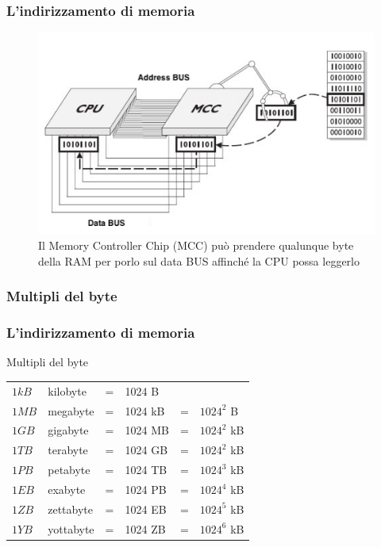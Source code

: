 \begin{frame}
	\frametitle{L'indirizzamento di memoria}
	
	\begin{figure}[!htbp]
		\centering 
		\includegraphics[width=0.85\linewidth]{images/5_memory/mcc.png}
		\caption{Il Memory Controller Chip (MCC) può prendere qualunque byte della RAM per porlo sul data BUS affinché la CPU possa leggerlo}
	\end{figure}
\end{frame}






\subsubsection[Multipli del byte]{Multipli del byte}
\begin{frame}
	\frametitle{L'indirizzamento di memoria}
	
	\begin{block}{Multipli del byte}
		\begin{table}[]
			\centering
			\begin{tabular}{llclcl}
			$1kB$ & kilobyte & = & 1024 B & &  \\
			$1MB$ & megabyte & = & 1024 kB & = & $1024^2$ B \\
			$1GB$ & gigabyte & = & 1024 MB & = & $1024^2$ kB \\
			$1TB$ & terabyte & = & 1024 GB & = & $1024^2$ kB \\
			$1PB$ & petabyte & = & 1024 TB & = & $1024^3$ kB \\
			$1EB$ & exabyte & = & 1024 PB & = & $1024^4$ kB \\
			$1ZB$ & zettabyte & = & 1024 EB & = & $1024^5$ kB \\
			$1YB$ & yottabyte & = & 1024 ZB & = & $1024^6$ kB \\
			\end{tabular}
		\end{table}		
	\end{block}
\end{frame}


